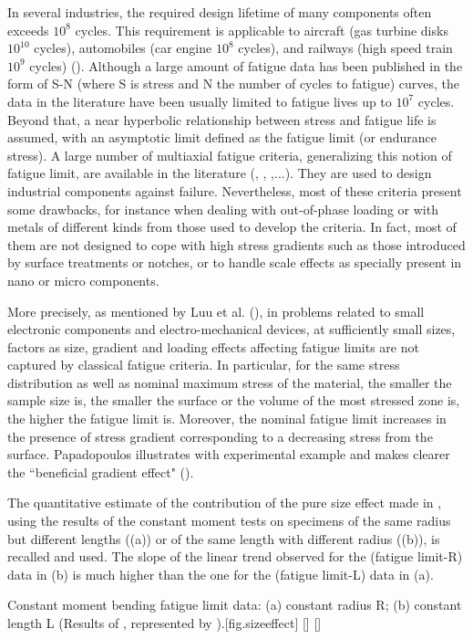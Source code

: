 In several industries, the required design lifetime of many components often exceeds $ 10^8 $ cycles. This requirement is applicable to aircraft (gas turbine disks $ 10^{10} $ cycles), automobiles (car engine $ 10^8 $ cycles), and railways (high speed train $ 10^9 $ cycles) (\cite{wachtman2009mechanical}). Although a large amount of fatigue data has been published in the form of S-N (where S is stress and N  the number of cycles to fatigue) curves, the data in the literature have been usually limited to fatigue lives up to $ 10^7 $ cycles. Beyond that, a near hyperbolic relationship between stress and fatigue life is assumed, with an asymptotic limit defined as the fatigue limit (or endurance stress). 
A large number of multiaxial fatigue criteria, generalizing this notion of fatigue limit, are available in the literature (\cite{Papadopoulos1997219}, \cite{ballard1995high}, \cite{suresh1998fatigue},...). They are  used to design industrial components against failure. Nevertheless, most of these criteria present some drawbacks,  for instance when dealing with out-of-phase loading or with metals of different kinds from those used to develop the criteria. In fact, most of them are not designed to cope with high stress gradients such as those introduced  by surface treatments or notches, or to handle  scale effects as  specially present in nano or micro components. 

More precisely, as mentioned by Luu et al. (\cite{luu2014formulation}), in problems related to small electronic components and electro-mechanical devices, at sufficiently small sizes, factors as size, gradient and loading effects affecting fatigue limits are not captured by classical fatigue criteria. In particular,  for the same stress distribution as well as nominal maximum stress of the material, the smaller the sample size is, the smaller the surface or the volume of the most stressed zone is, the higher the fatigue limit is.  Moreover, the nominal fatigue limit increases in the presence of stress gradient corresponding to a decreasing stress from the surface. Papadopoulos illustrates with experimental example and makes clearer the ``beneficial gradient effect" (\cite{Papadopoulos1996513}). 

The quantitative estimate of the contribution of the pure size effect made in \cite{Papadopoulos1996513}, using the results of the constant moment tests on specimens of the same radius but different lengths ((a)) or of the same length with different radius ((b)), is recalled and
used. The slope of the linear trend observed for the (fatigue limit-R)
data in (b) is much higher than the one for the (fatigue limit-L) data in (a).
\begin{Figure}[!h]{Constant moment bending fatigue limit data: (a) constant radius R; (b) constant length L (Results of \cite{Pogoretskii1966}, represented by \cite{weber1999fatigue}).}[fig.sizeeffect]
\end{Figure}

